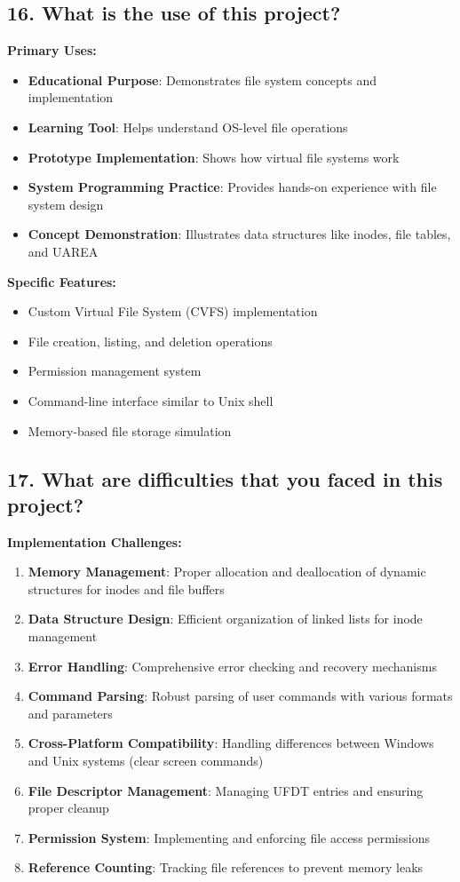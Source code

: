 \documentclass[11pt,a4paper]{article}
\begin{document}
\subsection{16. What is the use of this project?}

\textbf{Primary Uses:}
\begin{itemize}
    \item \textbf{Educational Purpose}: Demonstrates file system concepts and implementation
    \item \textbf{Learning Tool}: Helps understand OS-level file operations
    \item \textbf{Prototype Implementation}: Shows how virtual file systems work
    \item \textbf{System Programming Practice}: Provides hands-on experience with file system design
    \item \textbf{Concept Demonstration}: Illustrates data structures like inodes, file tables, and UAREA
\end{itemize}

\textbf{Specific Features:}
\begin{itemize}
    \item Custom Virtual File System (CVFS) implementation
    \item File creation, listing, and deletion operations
    \item Permission management system
    \item Command-line interface similar to Unix shell
    \item Memory-based file storage simulation
\end{itemize}

\subsection{17. What are difficulties that you faced in this project?}

\textbf{Implementation Challenges:}
\begin{enumerate}
    \item \textbf{Memory Management}: Proper allocation and deallocation of dynamic structures for inodes and file buffers
    \item \textbf{Data Structure Design}: Efficient organization of linked lists for inode management
    \item \textbf{Error Handling}: Comprehensive error checking and recovery mechanisms
    \item \textbf{Command Parsing}: Robust parsing of user commands with various formats and parameters
    \item \textbf{Cross-Platform Compatibility}: Handling differences between Windows and Unix systems (clear screen commands)
    \item \textbf{File Descriptor Management}: Managing UFDT entries and ensuring proper cleanup
    \item \textbf{Permission System}: Implementing and enforcing file access permissions
    \item \textbf{Reference Counting}: Tracking file references to prevent memory leaks
\end{enumerate}
\end{document}
